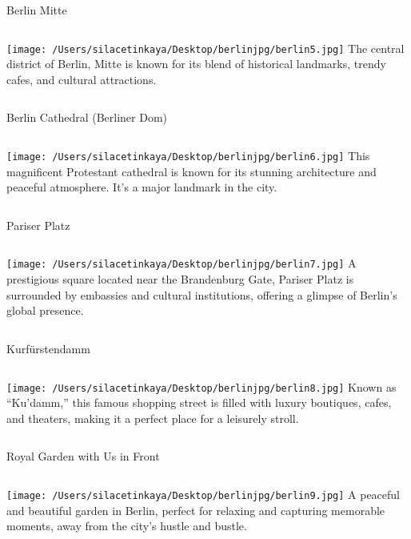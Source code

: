 \documentclass[aspectratio=169]{beamer}
\begin{document}
\begin{frame}{Berlin Mitte}
    \begin{columns}
        \centering
        \texttt{[image: /Users/silacetinkaya/Desktop/berlinjpg/berlin5.jpg]}
        \textbf{} The central district of Berlin, Mitte is known for its blend of historical landmarks, trendy cafes, and cultural attractions.
    \end{columns}
\end{frame}

\begin{frame}{Berlin Cathedral (Berliner Dom)}
    \begin{columns}
        \centering
        \texttt{[image: /Users/silacetinkaya/Desktop/berlinjpg/berlin6.jpg]}
        \textbf{} This magnificent Protestant cathedral is known for its stunning architecture and peaceful atmosphere. It’s a major landmark in the city.
    \end{columns}
\end{frame}

\begin{frame}{Pariser Platz}
    \begin{columns}
        \centering
        \texttt{[image: /Users/silacetinkaya/Desktop/berlinjpg/berlin7.jpg]}
        \textbf{} A prestigious square located near the Brandenburg Gate, Pariser Platz is surrounded by embassies and cultural institutions, offering a glimpse of Berlin’s global presence.
    \end{columns}
\end{frame}

\begin{frame}{Kurfürstendamm}
    \begin{columns}
        \centering
        \texttt{[image: /Users/silacetinkaya/Desktop/berlinjpg/berlin8.jpg]}
        \textbf{} Known as “Ku’damm,” this famous shopping street is filled with luxury boutiques, cafes, and theaters, making it a perfect place for a leisurely stroll.
    \end{columns}
\end{frame}

\begin{frame}{Royal Garden with Us in Front}
    \begin{columns}
        \centering
        \texttt{[image: /Users/silacetinkaya/Desktop/berlinjpg/berlin9.jpg]}
        \textbf{} A peaceful and beautiful garden in Berlin, perfect for relaxing and capturing memorable moments, away from the city’s hustle and bustle.
    \end{columns}
\end{frame}
\end{document}
